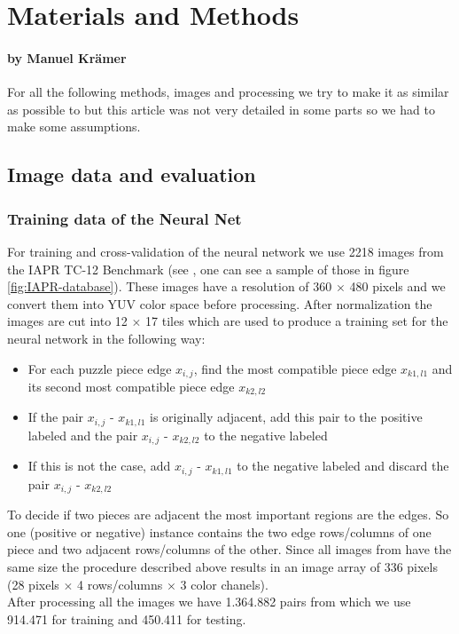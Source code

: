 \documentclass[11pt]{report}
\begin{document}
\chapter{Materials and Methods}
\subsubsection*{by Manuel Krämer}

For all the following methods, images and processing we try to make it as
similar as possible to \cite{sholomon2016dnn} but this article was not very
detailed in some parts so we had to make some assumptions.

\section{Image data and evaluation}
\subsection{Training data of the Neural Net}
For training and cross-validation of the neural network we use 2218 images from the IAPR TC-12 Benchmark (see \cite{grubinger06}, one can see a sample of those in figure \ref{fig:IAPR-database}). These images have a resolution of 360 $\times$ 480 pixels and we convert them into YUV color space before processing. After normalization the images are cut into 12 $\times$ 17 tiles which are used to produce a training set for the neural network in the following way:
\begin{itemize}
	\item For each puzzle piece edge $x_{i,j}$, find the most compatible piece edge $x_{k1,l1}$ and its second most compatible piece edge $x_{k2,l2}$
	\item  If the pair $x_{i,j}$ - $x_{k1,l1}$ is originally adjacent, add this pair to the positive labeled and the pair $x_{i,j}$ - $x_{k2,l2}$ to the negative labeled
	\item If this is not the case, add $x_{i,j}$ - $x_{k1,l1}$ to the negative labeled and discard the pair $x_{i,j}$ - $x_{k2,l2}$
\end{itemize}
To decide if two pieces are adjacent the most important regions are the edges. So one (positive or negative) instance contains the two edge rows/columns of one piece and two adjacent rows/columns of the other. Since all images from \cite{grubinger06} have the same size the procedure described above results in an image array of 336 pixels (28 pixels $\times$ 4 rows/columns $\times$ 3 color chanels). \\
After processing all the images we have 1.364.882 pairs from which we use 914.471 for training and 450.411 for testing.
\end{document}
